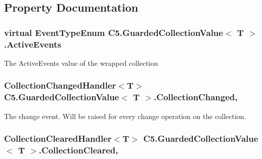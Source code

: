 \subsection{Property Documentation}
\hypertarget{class_c5_1_1_guarded_collection_value_af2f6e3f9dac82651c997ea9b94fffe46}{}
\subsubsection[{Active\+Events}]{\setlength{\rightskip}{0pt plus 5cm}virtual {\bf Event\+Type\+Enum} {\bf C5.\+Guarded\+Collection\+Value}$<$ T $>$.Active\+Events\hspace{0.3cm}{\ttfamily [get]}}\label{class_c5_1_1_guarded_collection_value_af2f6e3f9dac82651c997ea9b94fffe46}


The Active\+Events value of the wrapped collection 

\hypertarget{class_c5_1_1_guarded_collection_value_a38a7720b5a831f9db428150c9a919705}{}
\subsubsection[{Collection\+Changed}]{\setlength{\rightskip}{0pt plus 5cm}Collection\+Changed\+Handler$<$T$>$ {\bf C5.\+Guarded\+Collection\+Value}$<$ T $>$.Collection\+Changed\hspace{0.3cm}{\ttfamily [add]}, {\ttfamily [remove]}}\label{class_c5_1_1_guarded_collection_value_a38a7720b5a831f9db428150c9a919705}


The change event. Will be raised for every change operation on the collection. 

\hypertarget{class_c5_1_1_guarded_collection_value_a380426d2c8a2a3b02ec8f9ef7deafdc3}{}
\subsubsection[{Collection\+Cleared}]{\setlength{\rightskip}{0pt plus 5cm}Collection\+Cleared\+Handler$<$T$>$ {\bf C5.\+Guarded\+Collection\+Value}$<$ T $>$.Collection\+Cleared\hspace{0.3cm}{\ttfamily [add]}, {\ttfamily [remove]}}\label{class_c5_1_1_guarded_collection_value_a380426d2c8a2a3b02ec8f9ef7deafdc3}



